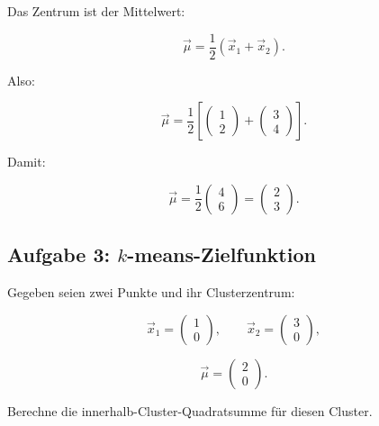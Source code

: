 \begin{examplebox}
Das Zentrum ist der Mittelwert:

\[
    \vec{\mu}
    =
    \frac{1}{2}
    \left(
        \vec{x}_1+\vec{x}_2
    \right).
\]

Also:

\[
    \vec{\mu}
    =
    \frac{1}{2}
    \left[
    \begin{pmatrix}
        1 \\
        2
    \end{pmatrix}
    +
    \begin{pmatrix}
        3 \\
        4
    \end{pmatrix}
    \right].
\]

Damit:

\[
    \vec{\mu}
    =
    \frac{1}{2}
    \begin{pmatrix}
        4 \\
        6
    \end{pmatrix}
    =
    \begin{pmatrix}
        2 \\
        3
    \end{pmatrix}.
\]
\end{examplebox}

\subsection{Aufgabe 3: \(k\)-means-Zielfunktion}

Gegeben seien zwei Punkte und ihr Clusterzentrum:

\[
    \vec{x}_1
    =
    \begin{pmatrix}
        1 \\
        0
    \end{pmatrix},
    \qquad
    \vec{x}_2
    =
    \begin{pmatrix}
        3 \\
        0
    \end{pmatrix},
\]

\[
    \vec{\mu}
    =
    \begin{pmatrix}
        2 \\
        0
    \end{pmatrix}.
\]

Berechne die innerhalb-Cluster-Quadratsumme für diesen Cluster.

